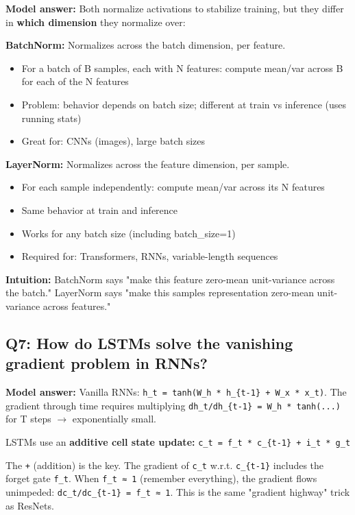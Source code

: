 \documentclass[11pt]{article}
\providecommand{\tightlist}{\setlength{\itemsep}{1pt}\setlength{\parskip}{0pt}}
\begin{document}
\textbf{Model answer:}
Both normalize activations to stabilize training, but they differ in \textbf{which dimension} they normalize over:

\textbf{BatchNorm:} Normalizes across the batch dimension, per feature.

\begin{itemize}
\tightlist
\item
  For a batch of B samples, each with N features: compute mean/var across B for each of the N features
\item
  Problem: behavior depends on batch size; different at train vs inference (uses running stats)
\item
  Great for: CNNs (images), large batch sizes
\end{itemize}

\textbf{LayerNorm:} Normalizes across the feature dimension, per sample.

\begin{itemize}
\tightlist
\item
  For each sample independently: compute mean/var across its N features
\item
  Same behavior at train and inference
\item
  Works for any batch size (including batch\_size=1)
\item
  Required for: Transformers, RNNs, variable-length sequences
\end{itemize}

\textbf{Intuition:} BatchNorm says "make this feature zero-mean unit-variance across the batch." LayerNorm says "make this sample\textquotesingle s representation zero-mean unit-variance across features."

\subsection{Q7: How do LSTMs solve the vanishing gradient problem in RNNs?}\label{q7-how-do-lstms-solve-the-vanishing-gradient-problem-in-rnns}

\textbf{Model answer:}
Vanilla RNNs: \texttt{h\_t\ =\ tanh(W\_h\ *\ h\_\{t-1\}\ +\ W\_x\ *\ x\_t)}. The gradient through time requires multiplying \texttt{dh\_t/dh\_\{t-1\}\ =\ W\_h\ *\ tanh\textquotesingle{}(...)} for T steps \(\rightarrow\) exponentially small.

LSTMs use an \textbf{additive cell state update:}
\texttt{c\_t\ =\ f\_t\ *\ c\_\{t-1\}\ +\ i\_t\ *\ g\_t}

The \texttt{+} (addition) is the key. The gradient of \texttt{c\_t} w.r.t. \texttt{c\_\{t-1\}} includes the forget gate \texttt{f\_t}. When \texttt{f\_t\ ≈\ 1} (remember everything), the gradient flows unimpeded: \texttt{dc\_t/dc\_\{t-1\}\ =\ f\_t\ ≈\ 1}. This is the same "gradient highway" trick as ResNets.
\end{document}
